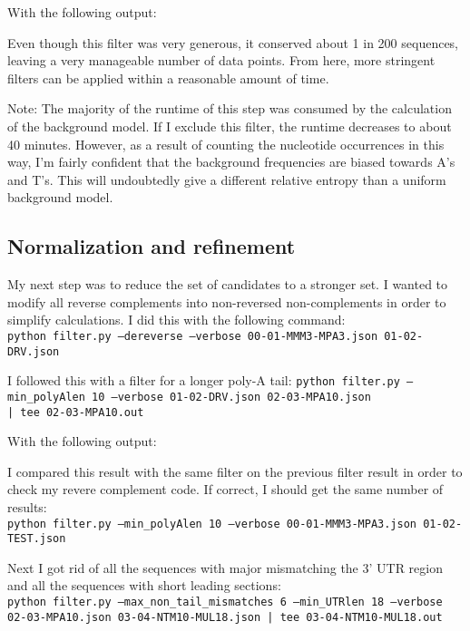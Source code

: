 \documentclass[a4paper, 12pt]{report}
\begin{document}
        With the following output:
        
        Even though this filter was very generous, it conserved about 1 in 200 sequences, 
            leaving a very manageable number of data points.  
        From here, more stringent filters can be applied within a reasonable amount of time.
        
        Note: The majority of the runtime of this step was consumed by the calculation of the background model.
        If I exclude this filter, the runtime decreases to about 40 minutes. 
        However, as a result of counting the nucleotide occurrences in this way, 
            I'm fairly confident that the background frequencies are biased 
            towards A's and T's.
        This will undoubtedly give a different relative entropy than a uniform background model.  
    
    \subsection{Normalization and refinement}
        My next step was to reduce the set of candidates to a stronger set.  
        I wanted to modify all reverse complements into non-reversed non-complements 
            in order to simplify calculations.  I did this with the following command: \\
        \texttt{python filter.py --dereverse --verbose 00-01-MMM3-MPA3.json 01-02-DRV.json}
            
        I followed this with a filter for a longer poly-A tail:
        \texttt{python filter.py --min\_polyAlen 10 --verbose 01-02-DRV.json 02-03-MPA10.json \\
                | tee 02-03-MPA10.out}
    
        With the following output:
        
                
        I compared this result with the same filter on the previous filter result 
            in order to check my revere complement code.
        If correct, I should get the same number of results: \\
        \texttt{python filter.py --min\_polyAlen 10 --verbose 00-01-MMM3-MPA3.json 01-02-TEST.json}
        
        Next I got rid of all the sequences with major mismatching the 3' UTR region
            and all the sequences with short leading sections: \\
        \texttt{python filter.py --max\_non\_tail\_mismatches 6 --min\_UTRlen 18 --verbose \\
                02-03-MPA10.json 03-04-NTM10-MUL18.json | tee 03-04-NTM10-MUL18.out}
    
\end{document}
